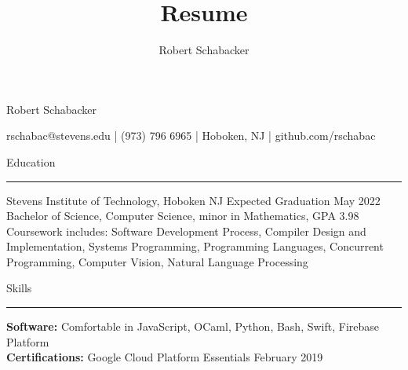 \documentclass{article}
\title{Resume}
\author{Robert Schabacker}
\newcommand \spacingBetweenHeadings {0.5em}
\begin{document}
\begin{center}
{\Huge Robert Schabacker\par}
{\Large rschabac@stevens.edu  |  (973) 796 6965  |  Hoboken, NJ  |  github.com/rschabac\par}
\end{center}
\vspace{-0.7em}
\vspace{\spacingBetweenHeadings}

\noindent
\huge Education\par
\vspace{0.1em}
\hrule
\Large
\vspace{1em}
\noindent
Stevens Institute of Technology, Hoboken NJ
\hfill
Expected Graduation May 2022\\
Bachelor of Science, Computer Science, minor in Mathematics, GPA 3.98\\
Coursework includes: Software Development Process, Compiler Design and Implementation, Systems Programming, Programming Languages, Concurrent Programming, Computer Vision, Natural Language Processing

\vspace{\spacingBetweenHeadings}

\noindent
\huge Skills\par
\vspace{0.1em}
\hrule
\Large
\vspace{1em}
\noindent
\textbf{Software:} Comfortable in JavaScript, OCaml, Python, Bash, Swift, Firebase Platform\\
\textbf{Certifications:} Google Cloud Platform Essentials
\hfill
February 2019

\vspace{\spacingBetweenHeadings}
\end{document}

